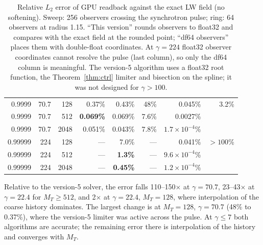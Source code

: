 \documentclass[11pt, a4paper]{article}
\begin{document}
\begin{table}[htbp]
{\begin{tabular}{@{}rrrrrrrr@{}}
0.9999  & 70.7  & 128  & 0.37\%              & 0.43\%              & 48\%     & 0.045\%             & 3.2\% \\
0.9999  & 70.7  & 512  & \textbf{0.069\%}    & 0.069\%             & 7.6\% & 0.0027\%            & \\
0.9999  & 70.7  & 2048 & 0.051\%             & 0.043\%             & 7.8\% & $1.7\times10^{-4}$\% & \\
0.99999 & 224   & 128  & ---                 & 7.0\%               & ---      & 0.041\%             & $>100$\% \\
0.99999 & 224   & 512  & ---                 & \textbf{1.3\%}      & ---      & $9.6\times10^{-4}$\% & \\
0.99999 & 224   & 2048 & ---                 & \textbf{0.45\%}     & ---      & $1.2\times10^{-4}$\% & \\
\bottomrule
\end{tabular}}
\caption{Relative $L_2$ error of GPU readback against the exact LW field (no softening). Sweep: 256 observers crossing the synchrotron pulse; ring: 64 observers at radius 1.15. ``This version'' rounds observers to float32 and compares with the exact field at the rounded point; ``df64 observers'' places them with double-float coordinates. At $\gamma = 224$ float32 observer coordinates cannot resolve the pulse (last column), so only the df64 column is meaningful. The version-5 algorithm uses a float32 root function, the Theorem~\ref{thm:ctrl} limiter and bisection on the spline; it was not designed for $\gamma > 100$.}
\label{tab:gamma}
\end{table}

Relative to the version-5 solver, the error falls 110--150$\times$ at $\gamma = 70.7$, 23--43$\times$ at $\gamma = 22.4$ for $M_T \ge 512$, and 2$\times$ at $\gamma = 22.4$, $M_T = 128$, where interpolation of the coarse history dominates. The largest change is at $M_T = 128$, $\gamma = 70.7$ (48\% to 0.37\%), where the version-5 limiter was active across the pulse. At $\gamma \le 7$ both algorithms are accurate; the remaining error there is interpolation of the history and converges with $M_T$.
\end{document}
